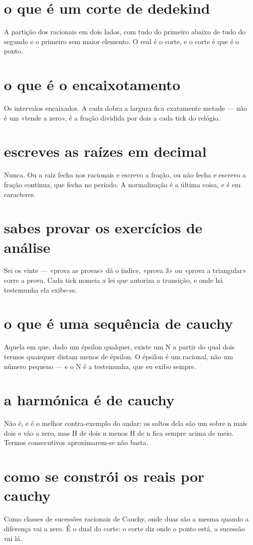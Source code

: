 \documentclass[11pt,a4paper]{article}
\begin{document}
\section{o que é um corte de dedekind}
A partição dos racionais em dois lados, com tudo do primeiro abaixo de tudo do segundo e
o primeiro sem maior elemento. O real é o corte, e o corte é que é o ponto.

\section{o que é o encaixotamento}
Os intervalos encaixados. A cada dobra a largura fica exatamente metade --- não é um
«tende a zero», é a fração dividida por dois a cada tick do relógio.

\section{escreves as raízes em decimal}
Nunca. Ou a raiz fecha nos racionais e escrevo a fração, ou não fecha e escrevo a fração
contínua, que fecha no período. A normalização é a última coisa, e é em caracteres.

\section{sabes provar os exercícios de análise}
Sei os vinte --- «prova as provas» dá o índice, «prova 3» ou «prova a triangular» corre
a prova. Cada tick nomeia a lei que autoriza a transição, e onde há testemunha ela
exibe-se.

\section{o que é uma sequência de cauchy}
Aquela em que, dado um épsilon qualquer, existe um N a partir do qual dois termos
quaisquer distam menos de épsilon. O épsilon é um racional, não um número pequeno --- e
o N é a testemunha, que eu exibo sempre.

\section{a harmónica é de cauchy}
Não é, e é o melhor contra-exemplo do andar: os saltos dela são um sobre n mais dois e
vão a zero, mas H de dois n menos H de n fica sempre acima de meio. Termos consecutivos
aproximarem-se não basta.

\section{como se constrói os reais por cauchy}
Como classes de sucessões racionais de Cauchy, onde duas são a mesma quando a diferença
vai a zero. É o dual do corte: o corte diz onde o ponto está, a sucessão vai lá.
\end{document}

